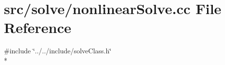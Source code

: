 \section{src/solve/nonlinear\-Solve.cc File Reference}
\label{nonlinear_solve_8cc}
{\ttfamily \#include \char`\"{}../../include/solve\-Class.\-h\char`\"{}}\\*
